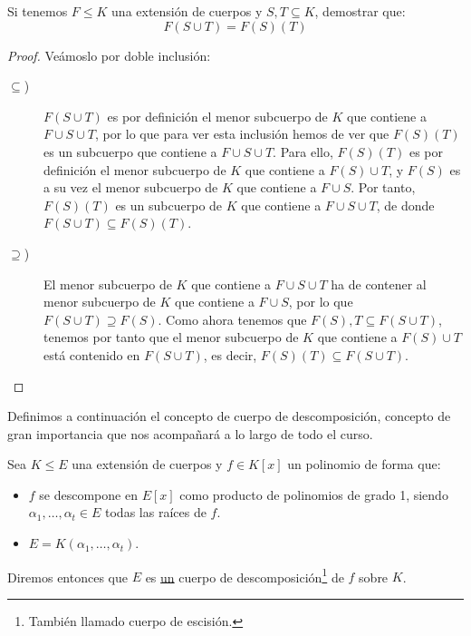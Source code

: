 \begin{ejercicio}
    Si tenemos $F\leq K$ una extensión de cuerpos y $S,T\subseteq K$, demostrar que:
    \begin{equation*}
        F(S\cup T) = F(S)(T)
    \end{equation*}
    \begin{proof}
        Veámoslo por doble inclusión:
        \begin{description}
            \item [$\subseteq$)] $F(S\cup T)$ es por definición el menor subcuerpo de $K$ que contiene a $F\cup S\cup T$, por lo que para ver esta inclusión hemos de ver que $F(S)(T)$ es un subcuerpo que contiene a $F\cup S\cup T$. Para ello, $F(S)(T)$ es por definición el menor subcuerpo de $K$ que contiene a $F(S)\cup T$, y $F(S)$ es a su vez el menor subcuerpo de $K$ que contiene a $F\cup S$. Por tanto, $F(S)(T)$ es un subcuerpo de $K$ que contiene a $F\cup S\cup T$, de donde $F(S\cup T)\subseteq F(S)(T)$.
            \item [$\supseteq$)] El menor subcuerpo de $K$ que contiene a $F\cup S\cup T$ ha de contener al menor subcuerpo de $K$ que contiene a $F\cup S$, por lo que $F(S\cup T)\supseteq F(S)$. Como ahora tenemos que $F(S),T\subseteq F(S\cup T)$, tenemos por tanto que el menor subcuerpo de $K$ que contiene a $F(S)\cup T$ está contenido en $F(S\cup T)$, es decir, $F(S)(T)\subseteq F(S\cup T)$.
        \end{description}
    \end{proof}
\end{ejercicio}

Definimos a continuación el concepto de cuerpo de descomposición, concepto de gran importancia que nos acompañará a lo largo de todo el curso.
\begin{definicion}\label{def:cuerpo_descomposicion}
    Sea $K\leq E$ una extensión de cuerpos y $f\in K[x]$ un polinomio de forma que:
    \begin{itemize}
        \item $f$ se descompone en $E[x]$ como producto de polinomios de grado 1, siendo $\alpha_1,\ldots,\alpha_t\in E$ todas las raíces de $f$.
        \item $E = K(\alpha_1,\ldots,\alpha_t)$.
    \end{itemize}
    Diremos entonces que $E$ es \underline{un} cuerpo de descomposición\footnote{También llamado cuerpo de escisión.} de $f$ sobre $K$.
\end{definicion}

